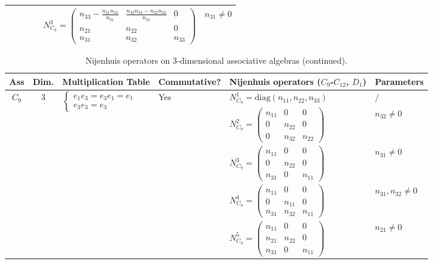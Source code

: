 \documentclass[12pt, reqno]{amsart}
\theoremstyle{plain}
\begin{document}
\begin{table}[H]
\begin{tabular}{|c|c|l|l|l|l|}
    & & & & $N_{C_8}^3 = \begin{pmatrix} n_{33}-\frac{n_{21}n_{32}}{n_{31}} & \frac{n_{32}n_{33}-n_{22}n_{32}}{n_{31}} & 0 \\ n_{21} & n_{22} & 0 \\ n_{31} & n_{32} & n_{33} \end{pmatrix}$ & $n_{31}\neq0$ \\
    \hline
    \end{tabular}
    \label{tab:nijenhuis_3d_associative_complete}
\end{table}

\begin{table}[H]
    \centering
    \tiny
    \caption{Nijenhuis operators on 3-dimensional associative algebras (continued).}
    \setlength{\tabcolsep}{1.5pt}
    \begin{tabular}{|c|c|l|l|l|l|}
    \hline
    \textbf{Ass} & \textbf{Dim.} & \textbf{Multiplication Table} & \textbf{Commutative?} & \textbf{Nijenhuis operators} ($C_9$-$C_{12}$, $D_1$) & \textbf{Parameters} \\
    \hline
    \multirow{6}{*}{$C_9$} & \multirow{6}{*}{3} & \multirow{6}{*}{$\begin{cases} e_1 e_3 = e_3 e_1 = e_1 \\ e_3 e_3 = e_3 \end{cases}$} & \multirow{6}{*}{Yes} & 
    $N_{C_9}^1 = \text{diag}(n_{11}, n_{22}, n_{33})$ & $/$ \\
    & & & & $N_{C_9}^2 = \begin{pmatrix} n_{11} & 0 & 0 \\ 0 & n_{22} & 0 \\ 0 & n_{32} & n_{22} \end{pmatrix}$ & $n_{32}\neq0$ \\
    & & & & $N_{C_9}^3 = \begin{pmatrix} n_{11} & 0 & 0 \\ 0 & n_{22} & 0 \\ n_{31} & 0 & n_{11} \end{pmatrix}$ & $n_{31}\neq0$ \\
    & & & & $N_{C_9}^4 = \begin{pmatrix} n_{11} & 0 & 0 \\ 0 & n_{11} & 0 \\ n_{31} & n_{32} & n_{11} \end{pmatrix}$ & $n_{31},n_{32}\neq0$ \\
    & & & & $N_{C_9}^5 = \begin{pmatrix} n_{11} & 0 & 0 \\ n_{21} & n_{22} & 0 \\ n_{31} & 0 & n_{11} \end{pmatrix}$ & $n_{21}\neq0$ \\

\end{tabular}
\end{table}
\end{document}
